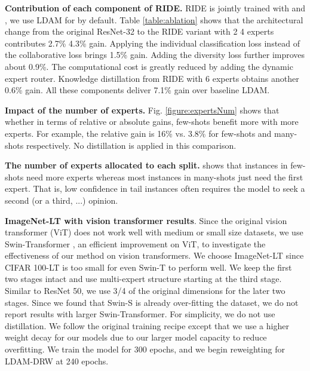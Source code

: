 {\bf{Contribution of each component of RIDE.}} 
RIDE is jointly trained with  and , we use LDAM for  by default. Table \ref{table:ablation} shows that the architectural change from the original ResNet-32 to the RIDE variant with 2  4 experts contributes 2.7\%  4.3\%  gain.  Applying the individual classification loss instead of the collaborative loss brings 1.5\% gain.  Adding the diversity loss further improves about 0.9\%. The computational cost is greatly reduced by adding the dynamic expert router.  Knowledge distillation from RIDE with 6 experts obtains another 0.6\% gain.  All these components deliver 7.1\% gain over baseline LDAM.

{\bf{Impact of the number of experts.}} Fig. \ref{figure:expertsNum} shows that whether in terms of relative or absolute gains, few-shots benefit more with more experts.  For example, the relative gain is 16\% vs. 3.8\% for few-shots and many-shots respectively. No distillation is applied in this comparison.

{\bf{The number of experts allocated to each split.}}  shows that instances in few-shots need more experts whereas most instances in many-shots just need the first expert.  That is, low confidence in tail instances often requires the model to seek a second (or a third, ...) opinion.


{\bf{ImageNet-LT with vision transformer results}}. Since the original vision transformer (ViT) \cite{dosovitskiy2021an} does not work well with medium or small size datasets, we use Swin-Transformer \cite{liu2021swin}, an efficient improvement on ViT, to investigate the effectiveness of our method on vision transformers. We choose ImageNet-LT since CIFAR 100-LT is too small for even Swin-T to perform well. We keep the first two stages intact and use multi-expert structure starting at the third stage. Similar to ResNet 50, we use 3/4 of the original dimensions for the later two stages. Since we found that Swin-S is already over-fitting the dataset, we do not report results with larger Swin-Transformer. For simplicity, we do not use distillation. We follow the original training recipe except that we use a higher weight decay for our models due to our larger model capacity to reduce overfitting. We train the model for 300 epochs, and we begin reweighting for LDAM-DRW at 240 epochs.


